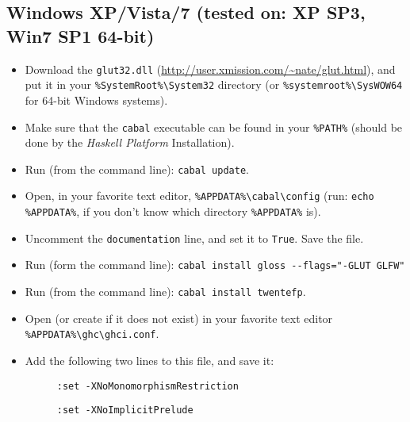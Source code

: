 \documentclass[]{article}
\begin{document}
\subsection{Windows XP/Vista/7 (tested on: XP SP3, Win7 SP1 64-bit)}
\begin{itemize}
  \item Download the \texttt{glut32.dll} (\url{http://user.xmission.com/~nate/glut.html}), and put it in your\newline{} \texttt{\%SystemRoot\%\textbackslash{}System32} directory (or \texttt{\%systemroot\%\textbackslash{}SysWOW64} for 64-bit Windows systems).
  \item Make sure that the \texttt{cabal} executable can be found in your \texttt{\%PATH\%} (should be done by the \emph{Haskell Platform} Installation).
  \item Run (from the command line): \texttt{cabal update}.
  \item Open, in your favorite text editor, \texttt{\%APPDATA\%\textbackslash{}cabal\textbackslash{}config} (run: \texttt{echo \%APPDATA\%}, if you don't know which directory \texttt{\%APPDATA\%} is).
  \item Uncomment the \texttt{documentation} line, and set it to \texttt{True}. Save the file.
  \item Run (form the command line): \texttt{cabal install gloss -{}-flags="-GLUT GLFW"}
  \item Run (from the command line): \texttt{cabal install twentefp}.
  \item Open (or create if it does not exist) in your favorite text editor \texttt{\%APPDATA\%\textbackslash{}ghc\textbackslash{}ghci.conf}.
  \item Add the following two lines to this file, and save it:
  \begin{description}
    \item[] \texttt{:set -XNoMonomorphismRestriction}
    \item[] \texttt{:set -XNoImplicitPrelude}
  \end{description}
\end{itemize}
\end{document}
